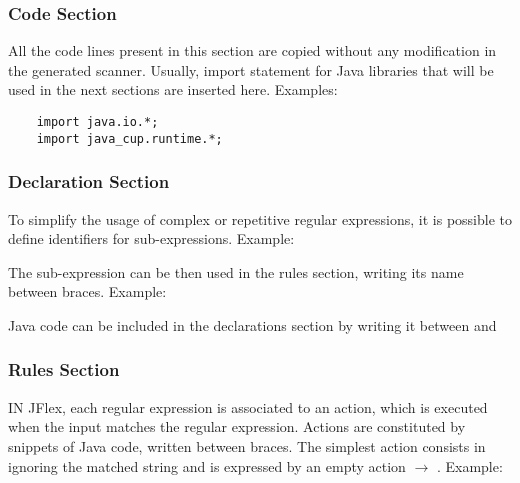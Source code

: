 \subsubsection{Code Section}
All the code lines present in this section are copied without any modification in the generated scanner.
Usually, import statement for Java libraries that will be used in the next sections are inserted here.
Examples:
\begin{lstlisting}
	import java.io.*;
	import java_cup.runtime.*;
\end{lstlisting}

\subsubsection{Declaration Section}
To simplify the usage of complex or repetitive regular expressions, it is possible to define identifiers for sub-expressions.
Example: 

The sub-expression can be then used in the rules section, writing its name between braces.
Example: 

Java code can be included in the declarations section by writing it between \code{\%\{} and \code{\%\}}

\subsubsection{Rules Section}
IN JFlex, each regular expression is associated to an action, which is executed when the input matches the regular expression.
Actions are constituted by snippets of Java code, written between braces.
The simplest action consists in ignoring the matched string and is expressed by an empty action $\to$ \code{\{;\}}.
Example: 

